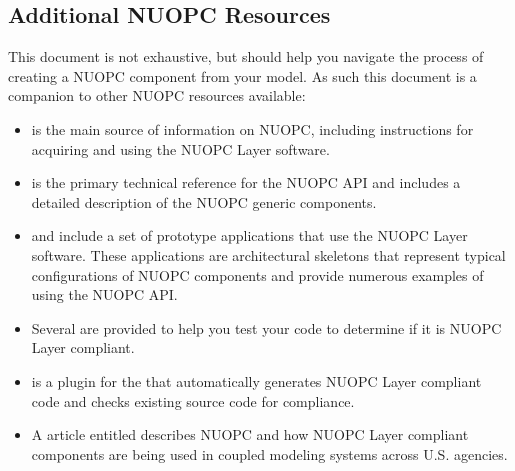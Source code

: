 \subsection{Additional NUOPC Resources}
This document is not exhaustive, but should help you navigate the process of creating
a NUOPC component from your model.  As such this document is a companion to other NUOPC 
resources available:
\begin{itemize}
\item {}
is the main source of information on NUOPC, including instructions
for acquiring and using the NUOPC Layer software.

\item {}
is the primary technical reference for the NUOPC API and includes
a detailed description of the NUOPC generic components.

\item {}
and 
include a set of prototype applications that use the NUOPC Layer software. These
applications are architectural skeletons that represent typical
configurations of NUOPC components and provide numerous examples
of using the NUOPC API.

\item Several 
are provided to help you test your code to determine if it is NUOPC Layer compliant.

\item {}
is a plugin for the 
that automatically generates NUOPC Layer compliant code and checks existing
source code for compliance.

\item A 
article entitled 
describes NUOPC and how NUOPC Layer compliant components are being used in coupled modeling
systems across U.S. agencies.

\end{itemize}

